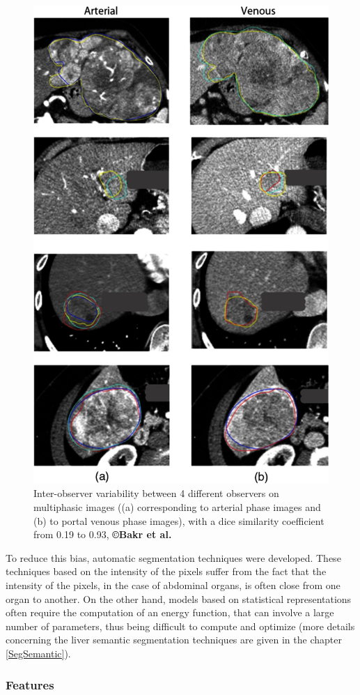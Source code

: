 \begin{figure}[th!]
	\centering
	\includegraphics[width=0.7\linewidth]{images/image14}
	\caption{Inter-observer variability between 4 different observers on multiphasic images ((a) corresponding to arterial phase images and (b) to portal venous phase images), with a dice similarity coefficient from 0.19 to 0.93, \textbf{©Bakr et al.} \cite{Bakr2017}}
	\label{Bakr_Fig2}
\end{figure}


To reduce this bias, automatic segmentation techniques were
developed. These techniques based on the intensity of the pixels suffer from the
fact that the intensity of the pixels, in the case of abdominal organs,
is often close from one organ to another. On the other hand, models
based on statistical representations often require the computation of an energy
function, that can involve a large number of parameters, thus being
difficult to compute and optimize (more details concerning the liver semantic 
segmentation techniques are given in the chapter \ref{SegSemantic}).\\

\subsubsection{Features}\label{features}

